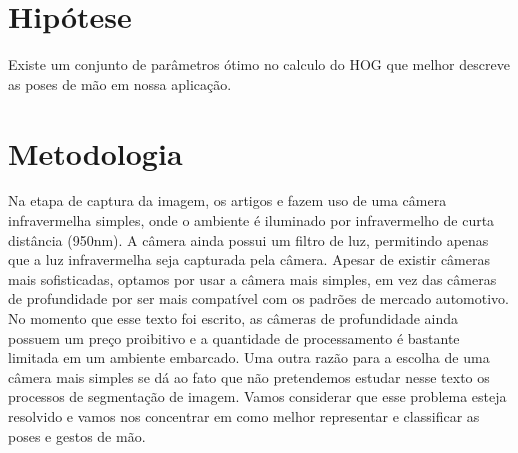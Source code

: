 




\section{Hipótese}

Existe um conjunto de parâmetros ótimo no calculo do HOG que melhor descreve as poses de mão em nossa aplicação.

\section{Metodologia}

Na etapa de captura da imagem, os artigos \cite{ref2} e \cite{ref1} fazem uso de uma câmera infravermelha simples, onde o ambiente é iluminado por infravermelho de curta distância (950nm). A câmera ainda possui um filtro de luz, permitindo apenas que a luz infravermelha seja capturada pela câmera. Apesar de existir câmeras mais sofisticadas, optamos por usar a câmera mais simples, em vez das câmeras de profundidade por ser mais compatível com os padrões de mercado automotivo. No momento que esse texto foi escrito, as câmeras de profundidade ainda possuem um preço proibitivo e a quantidade de processamento é bastante limitada em um ambiente embarcado. Uma outra razão para a escolha de uma câmera mais simples se dá ao fato que não pretendemos estudar nesse texto os processos de segmentação de imagem. Vamos considerar que esse problema esteja resolvido e vamos nos concentrar em como melhor representar e classificar as poses e gestos de mão.

